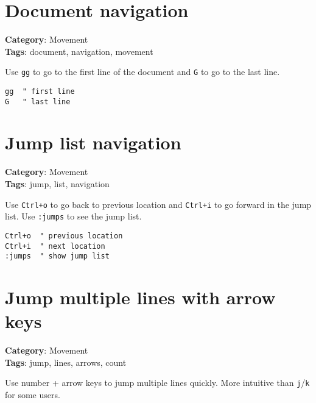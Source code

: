 {{{{{{{\section{Document navigation}

\textbf{Category}: Movement\\ \textbf{Tags}: document, navigation, movement
\vspace{0.5cm}

Use {\footnotesize \Verb§gg§} to go to the first line of the document and {\footnotesize \Verb§G§} to go to the last line.

\begin{Exa*}{}
\begin{Verbatim}[fontsize=\footnotesize, breaklines, breakanywhere]
gg  " first line
G   " last line
\end{Verbatim}
\end{Exa*}

\section{Jump list navigation}

\textbf{Category}: Movement\\ \textbf{Tags}: jump, list, navigation
\vspace{0.5cm}

Use {\footnotesize \Verb§Ctrl+o§} to go back to previous location and {\footnotesize \Verb§Ctrl+i§} to go forward in the jump list. Use {\footnotesize \Verb§:jumps§} to see the jump list.

\begin{Exa*}{}
\begin{Verbatim}[fontsize=\footnotesize, breaklines, breakanywhere]
Ctrl+o  " previous location
Ctrl+i  " next location
:jumps  " show jump list
\end{Verbatim}
\end{Exa*}

\section{Jump multiple lines with arrow keys}

\textbf{Category}: Movement\\ \textbf{Tags}: jump, lines, arrows, count
\vspace{0.5cm}

Use number + arrow keys to jump multiple lines quickly. More intuitive than {\footnotesize \Verb§j§}/{\footnotesize \Verb§k§} for some users.

}}}}}}}
